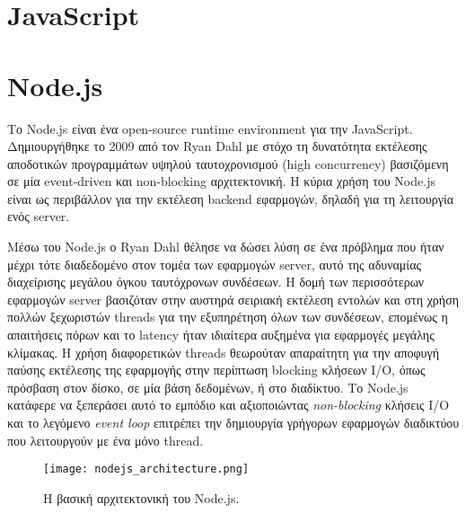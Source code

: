 \documentclass[../thesis.tex]{subfiles}
\begin{document}
\section{JavaScript}


\section{Node.js}

Το Node.js είναι ένα open-source runtime environment για την JavaScript.
Δημιουργήθηκε το 2009 από τον Ryan Dahl με στόχο τη δυνατότητα εκτέλεσης αποδοτικών προγραμμάτων υψηλού ταυτοχρονισμού (high concurrency) βασιζόμενη σε μία event-driven και non-blocking αρχιτεκτονική.
Η κύρια χρήση του Node.js είναι ως περιβάλλον για την εκτέλεση backend εφαρμογών, δηλαδή για τη λειτουργία ενός server.

Μέσω του Node.js ο Ryan Dahl θέλησε να δώσει λύση σε ένα πρόβλημα που ήταν μέχρι τότε διαδεδομένο στον τομέα των εφαρμογών server, αυτό της αδυναμίας διαχείρισης μεγάλου όγκου ταυτόχρονων συνδέσεων.
Η δομή των περισσότερων εφαρμογών server βασιζόταν στην αυστηρά σειριακή εκτέλεση εντολών και στη χρήση πολλών ξεχωριστών threads για την εξυπηρέτηση όλων των συνδέσεων, επομένως η απαιτήσεις πόρων και το latency ήταν ιδιαίτερα αυξημένα για εφαρμογές μεγάλης κλίμακας.
Η χρήση διαφορετικών threads θεωρούταν απαραίτητη για την αποφυγή παύσης εκτέλεσης της εφαρμογής στην περίπτωση blocking κλήσεων I/O, όπως πρόσβαση στον δίσκο, σε μία βάση δεδομένων, ή στο διαδίκτυο.
Το Node.js κατάφερε να ξεπεράσει αυτό το εμπόδιο και αξιοποιώντας \textit{non-blocking} κλήσεις I/O και το λεγόμενο \textit{event loop} επιτρέπει την δημιουργία γρήγορων εφαρμογών διαδικτύου που λειτουργούν με ένα μόνο thread.

\begin{figure}[!ht]
    \texttt{[image: nodejs\_architecture.png]}
    \centering
    \caption{Η βασική αρχιτεκτονική του Node.js\cite{node_architecture_diagram}.}
\end{figure}
\end{document}
